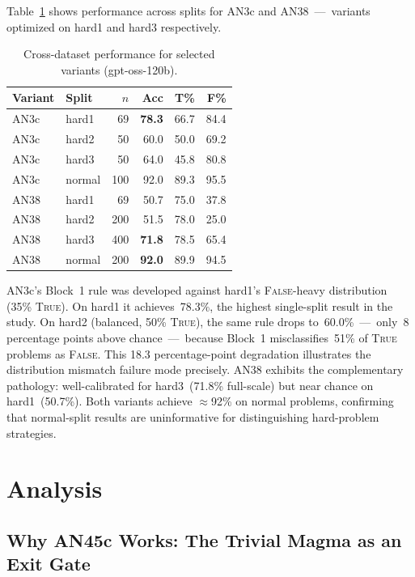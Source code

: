 \documentclass[11pt]{article}
\begin{document}
Table~\ref{tab:crossdataset} shows performance across splits for AN3c
and AN38~---~variants optimized on hard1 and hard3 respectively.

\begin{table}[h]
\centering
\caption{Cross-dataset performance for selected variants (gpt-oss-120b).}
\label{tab:crossdataset}
\begin{tabular}{llrrrr}
\toprule
Variant & Split & $n$ & Acc & T\% & F\% \\
\midrule
AN3c & hard1  & 69  & \textbf{78.3} & 66.7 & 84.4 \\
AN3c & hard2  & 50  & 60.0 & 50.0 & 69.2 \\
AN3c & hard3  & 50  & 64.0 & 45.8 & 80.8 \\
AN3c & normal & 100 & 92.0 & 89.3 & 95.5 \\
\midrule
AN38 & hard1  & 69  & 50.7 & 75.0 & 37.8 \\
AN38 & hard2  & 200 & 51.5 & 78.0 & 25.0 \\
AN38 & hard3  & 400 & \textbf{71.8} & 78.5 & 65.4 \\
AN38 & normal & 200 & \textbf{92.0} & 89.9 & 94.5 \\
\bottomrule
\end{tabular}
\end{table}

AN3c's Block~1 rule was developed against hard1's \textsc{False}-heavy
distribution (35\% \textsc{True}). On hard1 it achieves~78.3\%, the
highest single-split result in the study. On hard2 (balanced, 50\%
\textsc{True}), the same rule drops to~60.0\%~---~only~8 percentage
points above chance~---~because Block~1 misclassifies~51\% of
\textsc{True} problems as \textsc{False}. This 18.3 percentage-point
degradation illustrates the distribution mismatch failure mode
precisely. AN38 exhibits the complementary pathology: well-calibrated
for hard3~(71.8\% full-scale) but near chance on hard1~(50.7\%). Both
variants achieve $\approx$92\% on normal problems, confirming that
normal-split results are uninformative for distinguishing hard-problem
strategies.

\section{Analysis}
\label{sec:analysis}

\subsection{Why AN45c Works: The Trivial Magma as an Exit Gate}
\end{document}
